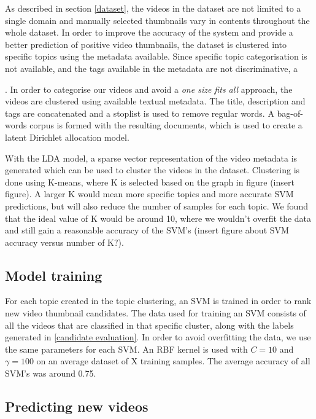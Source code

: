 \documentclass{../resources/acm_proc_article-sp}
\begin{document}
As described in section \ref{dataset}, the videos in the dataset are not limited to a single domain and manually selected thumbnails vary in contents throughout the whole dataset. In order to improve the accuracy of the system and provide a better prediction of positive video thumbnails, the dataset is clustered into specific topics using the metadata available. Since specific topic categorisation is not available, and the tags available in the metadata are not discriminative, a 

. In order to categorise our videos and avoid a \textit{one size fits all} approach, the videos are clustered using available textual metadata. The title, description and tags are concatenated and a stoplist is used to remove regular words. A bag-of-words corpus is formed with the resulting documents, which is used to create a latent Dirichlet allocation model.

With the LDA model, a sparse vector representation of the video metadata is generated which can be used to cluster the videos in the dataset. Clustering is done using K-means, where K is selected based on the graph in figure (insert figure). A larger K would mean more specific topics and more accurate SVM predictions, but will also reduce the number of samples for each topic. We found that the ideal value of K would be around 10, where we wouldn't overfit the data and still gain a reasonable accuracy of the SVM's (insert figure about SVM accuracy versus number of K?).


\subsection{Model training}
\label{model training}

For each topic created in the topic clustering, an SVM is trained in order to rank new video thumbnail candidates. The data used for training an SVM consists of all the videos that are classified in that specific cluster, along with the labels generated in \ref{candidate evaluation}. In order to avoid overfitting the data, we use the same parameters for each SVM. An RBF kernel is used with $C = 10$ and $\gamma = 100$ on an average dataset of X training samples. The average accuracy of all SVM's was around 0.75.


\subsection{Predicting new videos}
\end{document}
